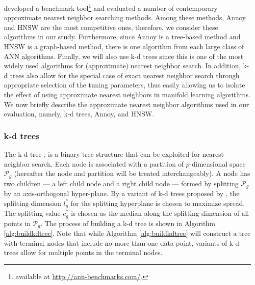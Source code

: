 \documentclass[11pt,a4paper,]{article}
\begin{document}
\textcite{Aumuller2020-nk} developed a benchmark tool\footnote{available at \url{http://ann-benchmarks.com/}.} and evaluated a number of contemporary approximate nearest neighbor searching methods. Among these methods, Annoy and HNSW are the most competitive ones, therefore, we consider these algorithms in our study. Furthermore, since Annoy is a tree-based method and HNSW is a graph-based method, there is one algorithm from each large class of ANN algorithms. Finally, we will also use k-d trees since this is one of the most widely used algorithms for (approximate) nearest neighbor search. In addition, k-d trees also allow for the special case of exact nearest neighbor search through appropriate selection of the tuning parameters, thus easily allowing us to isolate the effect of using approximate nearest neighbors in manifold learning algorithms. We now briefly describe the approximate nearest neighbor algorithms used in our evaluation, namely, k-d trees, Annoy, and HNSW.

\hypertarget{k-d-trees}{%
\subsubsection*{k-d trees}\label{k-d-trees}}

The k-d tree \autocite{Bentley1975-zo}, is a binary tree structure that can be exploited for nearest neighbor search. Each node is associated with a partition of \(p\)-dimensional space \(\mathcal{P}_g\) (hereafter the node and partition will be treated interchangeably). A node has two children --- a left child node and a right child node --- formed by splitting \(\mathcal{P}_g\) by an axis-orthogonal hyper-plane. By a variant of k-d trees proposed by \textcite{Friedman1977-dh}, the splitting dimension \(l_g^*\) for the splitting hyperplane is chosen to maximize spread. The splitting value \(c_g^*\) is chosen as the median along the splitting dimension of all points in \(\mathcal{P}_g\). The process of building a k-d tree is shown in Algorithm \ref{alg:buildkdtree}. Note that while Algorithm \ref{alg:buildkdtree} will construct a tree with terminal nodes that include no more than one data point, variants of k-d trees allow for multiple points in the terminal nodes.
\end{document}
